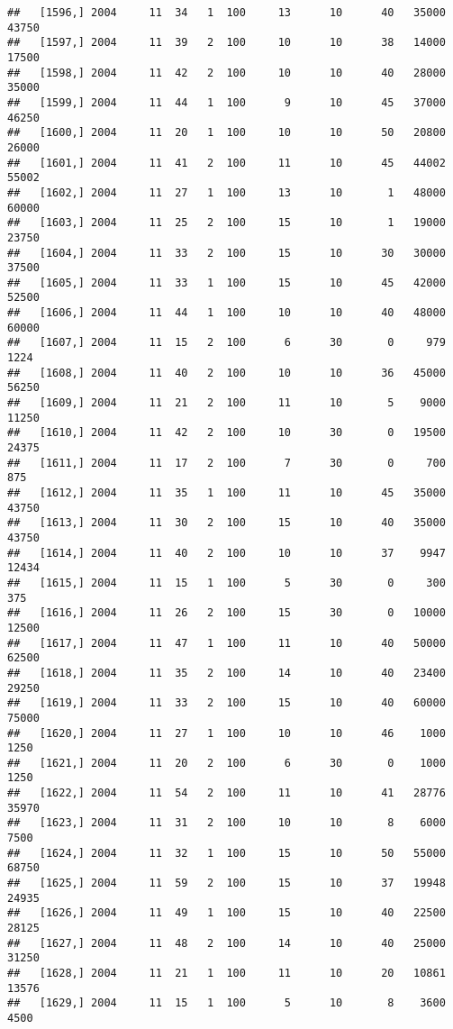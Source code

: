\documentclass{article}\usepackage[]{graphicx}\usepackage[]{color}
\makeatletter
\newenvironment{kframe}{%
 \def\at@end@of@kframe{}%
 \ifinner\ifhmode%
  \def\at@end@of@kframe{\end{minipage}}%
  \begin{minipage}{\columnwidth}%
 \fi\fi%
 \def\FrameCommand##1{\hskip\@totalleftmargin \hskip-\fboxsep
 \colorbox{shadecolor}{##1}\hskip-\fboxsep
     \hskip-\linewidth \hskip-\@totalleftmargin \hskip\columnwidth}%
 \MakeFramed {\advance\hsize-\width
   \@totalleftmargin\z@ \linewidth\hsize
   \@setminipage}}%
 {\par\unskip\endMakeFramed%
 \at@end@of@kframe}
\newenvironment{knitrout}{}{} %
\makeatother
\begin{document}
\begin{knitrout}
\begin{kframe}
\begin{verbatim}
##   [1596,] 2004     11  34   1  100     13      10      40   35000   43750
##   [1597,] 2004     11  39   2  100     10      10      38   14000   17500
##   [1598,] 2004     11  42   2  100     10      10      40   28000   35000
##   [1599,] 2004     11  44   1  100      9      10      45   37000   46250
##   [1600,] 2004     11  20   1  100     10      10      50   20800   26000
##   [1601,] 2004     11  41   2  100     11      10      45   44002   55002
##   [1602,] 2004     11  27   1  100     13      10       1   48000   60000
##   [1603,] 2004     11  25   2  100     15      10       1   19000   23750
##   [1604,] 2004     11  33   2  100     15      10      30   30000   37500
##   [1605,] 2004     11  33   1  100     15      10      45   42000   52500
##   [1606,] 2004     11  44   1  100     10      10      40   48000   60000
##   [1607,] 2004     11  15   2  100      6      30       0     979    1224
##   [1608,] 2004     11  40   2  100     10      10      36   45000   56250
##   [1609,] 2004     11  21   2  100     11      10       5    9000   11250
##   [1610,] 2004     11  42   2  100     10      30       0   19500   24375
##   [1611,] 2004     11  17   2  100      7      30       0     700     875
##   [1612,] 2004     11  35   1  100     11      10      45   35000   43750
##   [1613,] 2004     11  30   2  100     15      10      40   35000   43750
##   [1614,] 2004     11  40   2  100     10      10      37    9947   12434
##   [1615,] 2004     11  15   1  100      5      30       0     300     375
##   [1616,] 2004     11  26   2  100     15      30       0   10000   12500
##   [1617,] 2004     11  47   1  100     11      10      40   50000   62500
##   [1618,] 2004     11  35   2  100     14      10      40   23400   29250
##   [1619,] 2004     11  33   2  100     15      10      40   60000   75000
##   [1620,] 2004     11  27   1  100     10      10      46    1000    1250
##   [1621,] 2004     11  20   2  100      6      30       0    1000    1250
##   [1622,] 2004     11  54   2  100     11      10      41   28776   35970
##   [1623,] 2004     11  31   2  100     10      10       8    6000    7500
##   [1624,] 2004     11  32   1  100     15      10      50   55000   68750
##   [1625,] 2004     11  59   2  100     15      10      37   19948   24935
##   [1626,] 2004     11  49   1  100     15      10      40   22500   28125
##   [1627,] 2004     11  48   2  100     14      10      40   25000   31250
##   [1628,] 2004     11  21   1  100     11      10      20   10861   13576
##   [1629,] 2004     11  15   1  100      5      10       8    3600    4500

\end{verbatim}
\end{kframe}
\end{knitrout}
\end{document}

